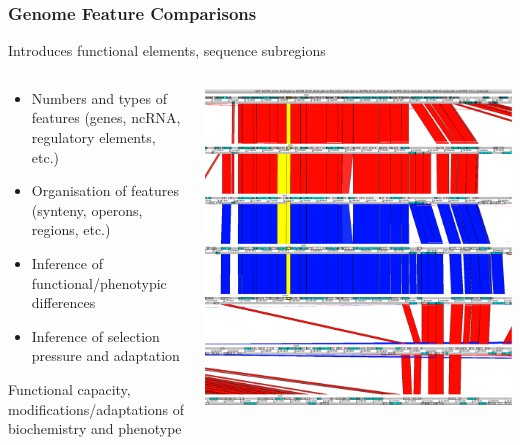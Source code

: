 \begin{frame}
  \frametitle{Genome Feature Comparisons}
  Introduces functional elements, sequence subregions
  \begin{columns}
    \begin{column}{5cm}
      \begin{itemize}
        \item Numbers and types of features (genes, ncRNA, regulatory elements, etc.)
        \item Organisation of features (synteny, operons, regions, etc.)
        \item Inference of functional/phenotypic differences
        \item Inference of selection pressure and adaptation
      \end{itemize}  
      Functional capacity, modifications/adaptations of biochemistry and phenotype  
    \end{column}
    \begin{column}{5cm}
      \includegraphics[width=1\textwidth]{images/t6ss}    
    \end{column}
  \end{columns}
\end{frame}